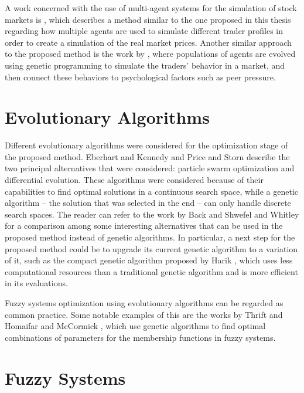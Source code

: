 A work concerned with the use of multi-agent systems for the simulation of stock
markets is \cite{Kendall2003}, which describes a method similar to the one
proposed in this thesis regarding how multiple agents are used to simulate
different trader profiles in order to create a simulation of the real market
prices. Another similar approach to the proposed method is the work by
\cite{Chen2001}, where populations of agents are evolved using genetic
programming to simulate the traders' behavior in a market, and then connect
these behaviors to psychological factors such as peer pressure.

\section{Evolutionary Algorithms}
\label{section:evolutionary-algorithms}

Different evolutionary algorithms were considered for the optimization stage of
the proposed method. Eberhart and Kennedy \cite{Eberhart2002} and Price and
Storn \cite{Price1997} describe the two principal alternatives that were
considered: particle swarm optimization and differential evolution. These
algorithms were considered because of their capabilities to find optimal
solutions in a continuous search space, while a genetic algorithm -- the
solution that was selected in the end -- can only handle discrete search
spaces. The reader can refer to the work by Back and Shwefel \cite{Back2008} and
Whitley \cite{Whitley1994} for a comparison among some interesting alternatives
that can be used in the proposed method instead of genetic algorithms. In
particular, a next step for the proposed method could be to upgrade its current
genetic algorithm to a variation of it, such as the compact genetic algorithm
proposed by Harik \cite{Harik1999}, which uses less computational resources than
a traditional genetic algorithm and is more efficient in its evaluations.

Fuzzy systems optimization using evolutionary algorithms can be regarded as
common practice. Some notable examples of this are the works by Thrift
\cite{Thrift1991} and Homaifar and McCormick \cite{Homaifar1995}, which use
genetic algorithms to find optimal combinations of parameters for the membership
functions in fuzzy systems.

\section{Fuzzy Systems}
\label{section:fuzzy-systems}

